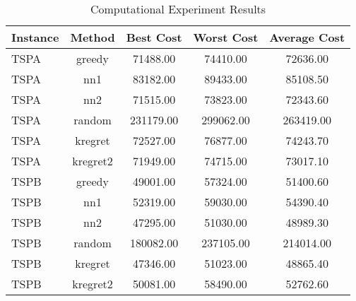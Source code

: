 \begin{table}[ht]
\centering
\caption{Computational Experiment Results}
\label{tab:results}
\begin{tabular}{lcccc}
\hline
Instance & Method & Best Cost & Worst Cost & Average Cost \\
\hline
TSPA & greedy & 71488.00 & 74410.00 & 72636.00 \\
TSPA & nn1 & 83182.00 & 89433.00 & 85108.50 \\
TSPA & nn2 & 71515.00 & 73823.00 & 72343.60 \\
TSPA & random & 231179.00 & 299062.00 & 263419.00 \\
TSPA & kregret & 72527.00 & 76877.00 & 74243.70 \\
TSPA & kregret2 & 71949.00 & 74715.00 & 73017.10 \\
TSPB & greedy & 49001.00 & 57324.00 & 51400.60 \\
TSPB & nn1 & 52319.00 & 59030.00 & 54390.40 \\
TSPB & nn2 & 47295.00 & 51030.00 & 48989.30 \\
TSPB & random & 180082.00 & 237105.00 & 214014.00 \\
TSPB & kregret & 47346.00 & 51023.00 & 48865.40 \\
TSPB & kregret2 & 50081.00 & 58490.00 & 52762.60 \\
\hline
\end{tabular}
\end{table}
